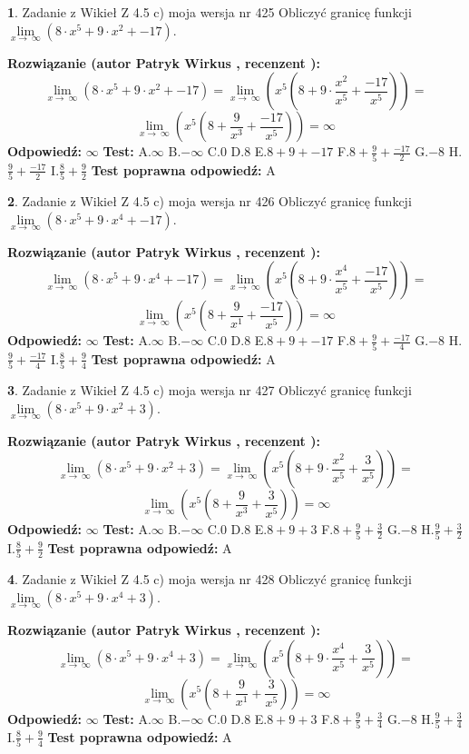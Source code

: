 \documentclass[12pt, a4paper]{article}
\theoremstyle{definition} %
\newtheorem{zad}{}
\newcommand{\zadStart}[1]{\begin{zad}#1\newline}
\newcommand{\zadStop}{\end{zad}}
\newcommand{\rozwStart}[2]{\noindent \textbf{Rozwiązanie (autor #1 , recenzent #2): }\newline}
\newcommand{\rozwStop}{\newline}
\newcommand{\odpStart}{\noindent \textbf{Odpowiedź:}\newline}
\newcommand{\odpStop}{\newline}
\newcommand{\testStart}{\noindent \textbf{Test:}\newline}
\newcommand{\testStop}{\newline}
\newcommand{\kluczStart}{\noindent \textbf{Test poprawna odpowiedź:}\newline}
\newcommand{\kluczStop}{\newline}
\begin{document}
\zadStart{Zadanie z Wikieł Z 4.5 c) moja wersja nr 425}
Obliczyć granicę funkcji  $\lim\limits_{x\to\ \infty}(8 \cdot x^{5}+9 \cdot x^{2}+-17)$.
\zadStop
\rozwStart{Patryk Wirkus}{}
$$\lim\limits_{x\to\ \infty}(8 \cdot x^{5}+9 \cdot x^{2}+-17) = \lim\limits_{x\to\ \infty}(x^{5}(8 +9 \cdot \frac{x^{2}}{x^{5}}+\frac{-17}{x^{5}})) =$$ $$\lim\limits_{x\to\ \infty}(x^{5}(8 +\frac{9}{x^{3}}+\frac{-17}{x^{5}})) =\infty$$
\rozwStop
\odpStart
$\infty$
\odpStop
\testStart
A.$\infty$ B.$-\infty$ C.$0$ D.$8$ E.$8 + 9 + -17$
F.$8+\frac{9}{5}+\frac{-17}{2}$ G.$-8$
H.$\frac{9}{5}+\frac{-17}{2}$
I.$\frac{8}{5}+\frac{9}{2}$
\testStop
\kluczStart
A
\kluczStop



\zadStart{Zadanie z Wikieł Z 4.5 c) moja wersja nr 426}
Obliczyć granicę funkcji  $\lim\limits_{x\to\ \infty}(8 \cdot x^{5}+9 \cdot x^{4}+-17)$.
\zadStop
\rozwStart{Patryk Wirkus}{}
$$\lim\limits_{x\to\ \infty}(8 \cdot x^{5}+9 \cdot x^{4}+-17) = \lim\limits_{x\to\ \infty}(x^{5}(8 +9 \cdot \frac{x^{4}}{x^{5}}+\frac{-17}{x^{5}})) =$$ $$\lim\limits_{x\to\ \infty}(x^{5}(8 +\frac{9}{x^{1}}+\frac{-17}{x^{5}})) =\infty$$
\rozwStop
\odpStart
$\infty$
\odpStop
\testStart
A.$\infty$ B.$-\infty$ C.$0$ D.$8$ E.$8 + 9 + -17$
F.$8+\frac{9}{5}+\frac{-17}{4}$ G.$-8$
H.$\frac{9}{5}+\frac{-17}{4}$
I.$\frac{8}{5}+\frac{9}{4}$
\testStop
\kluczStart
A
\kluczStop



\zadStart{Zadanie z Wikieł Z 4.5 c) moja wersja nr 427}
Obliczyć granicę funkcji  $\lim\limits_{x\to\ \infty}(8 \cdot x^{5}+9 \cdot x^{2}+3)$.
\zadStop
\rozwStart{Patryk Wirkus}{}
$$\lim\limits_{x\to\ \infty}(8 \cdot x^{5}+9 \cdot x^{2}+3) = \lim\limits_{x\to\ \infty}(x^{5}(8 +9 \cdot \frac{x^{2}}{x^{5}}+\frac{3}{x^{5}})) =$$ $$\lim\limits_{x\to\ \infty}(x^{5}(8 +\frac{9}{x^{3}}+\frac{3}{x^{5}})) =\infty$$
\rozwStop
\odpStart
$\infty$
\odpStop
\testStart
A.$\infty$ B.$-\infty$ C.$0$ D.$8$ E.$8 + 9 + 3$
F.$8+\frac{9}{5}+\frac{3}{2}$ G.$-8$
H.$\frac{9}{5}+\frac{3}{2}$
I.$\frac{8}{5}+\frac{9}{2}$
\testStop
\kluczStart
A
\kluczStop



\zadStart{Zadanie z Wikieł Z 4.5 c) moja wersja nr 428}
Obliczyć granicę funkcji  $\lim\limits_{x\to\ \infty}(8 \cdot x^{5}+9 \cdot x^{4}+3)$.
\zadStop
\rozwStart{Patryk Wirkus}{}
$$\lim\limits_{x\to\ \infty}(8 \cdot x^{5}+9 \cdot x^{4}+3) = \lim\limits_{x\to\ \infty}(x^{5}(8 +9 \cdot \frac{x^{4}}{x^{5}}+\frac{3}{x^{5}})) =$$ $$\lim\limits_{x\to\ \infty}(x^{5}(8 +\frac{9}{x^{1}}+\frac{3}{x^{5}})) =\infty$$
\rozwStop
\odpStart
$\infty$
\odpStop
\testStart
A.$\infty$ B.$-\infty$ C.$0$ D.$8$ E.$8 + 9 + 3$
F.$8+\frac{9}{5}+\frac{3}{4}$ G.$-8$
H.$\frac{9}{5}+\frac{3}{4}$
I.$\frac{8}{5}+\frac{9}{4}$
\testStop
\kluczStart
A
\kluczStop
\end{document}

